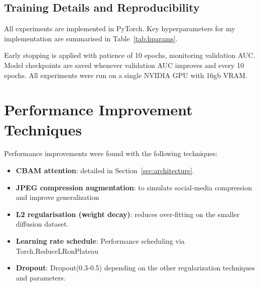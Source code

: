 \documentclass[conference]{IEEEtran}
\begin{document}
\subsection{Training Details and Reproducibility}
\label{sec:training}

All experiments are implemented in PyTorch.  Key hyperparameters for my implementation are
summarised in Table~\ref{tab:hparams}.

\begin{table}[h]
\centering
\caption{Training Hyperparameters}
\label{tab:hparams}
\end{table}

Early stopping is applied with patience of 10 epochs, monitoring
validation AUC.  Model checkpoints are saved whenever validation AUC
improves and every 10 epochs. All experiments were run on a single NVIDIA GPU with 16gb VRAM.

\section{Performance Improvement Techniques}
\label{sec:improvements}

Performance improvements were found with the following techniques:

\begin{itemize}
  \item \textbf{CBAM attention}: detailed in Section~\ref{sec:architecture}.
  \item \textbf{JPEG compression augmentation}: to simulate social-media compression and improve generalization
  \item \textbf{L2 regularisation (weight decay)}: reduces over-fitting
        on the smaller diffusion dataset.
  \item \textbf{Learning rate schedule}: Performance scheduling via Torch.ReduceLRonPlateau
  \item \textbf{Dropout}: Dropout(0.3-0.5) depending on the other regularization techniques and parameters.
\end{itemize}
\end{document}

